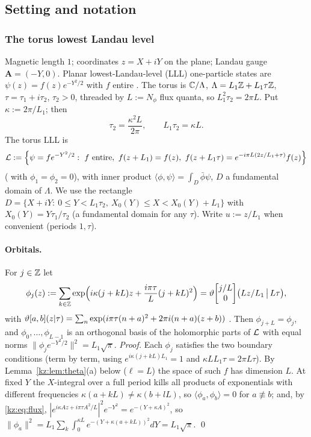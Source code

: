 \subsection{Setting and notation}\label{kz:sec:setting}

\subsubsection{The torus lowest Landau level}\label{kz:sec:lll}

Magnetic length $1$; coordinates $z=X+iY$ on the plane; Landau gauge $\mathbf A=(-Y,0)$. Planar
lowest-Landau-level (LLL) one-particle states are $\psi(z)=f(z)e^{-Y^2/2}$ with $f$ entire
\cite[eq.~(44)]{RR96}. The torus is
$\mathbb{C}/\Lambda$, $\Lambda=L_1\mathbb{Z}+L_1\tau\mathbb{Z}$, $\tau=\tau_1+i\tau_2$, $\tau_2>0$, threaded by $L:=N_\phi$
flux quanta, so $L_1^2\tau_2=2\pi L$. Put $\kappa:=2\pi/L_1$; then
\begin{equation}\label{kz:eq:flux}
\tau_2=\frac{\kappa^2L}{2\pi},\qquad L_1\tau_2=\kappa L .
\end{equation}
The torus LLL is
\[
\kzL:=\Big\{\psi=fe^{-Y^2/2}:\ f\ \text{entire},\ f(z+L_1)=f(z),\
f(z+L_1\tau)=e^{-i\pi L(2z/L_1+\tau)}f(z)\Big\}
\]
(\cite[eq.~(45)]{RR96} with $\phi_1=\phi_2=0$), with inner product $\langle\phi,\psi\rangle=\int_D\bar\phi\psi$,
$D$ a fundamental domain of $\Lambda$. We use the rectangle $D=\{X+iY:\ 0\le Y<L_1\tau_2,\
X_0(Y)\le X<X_0(Y)+L_1\}$ with $X_0(Y)=Y\tau_1/\tau_2$ (a fundamental domain for any $\tau$).
Write $u:=z/L_1$ when convenient (periods $1,\tau$).

\paragraph{Orbitals.} For $j\in\mathbb{Z}$ let
\begin{equation}\label{kz:eq:orbital}
\phi_j(z):=\sum_{k\in\mathbb{Z}}\exp\!\Big(i\kappa(j+kL)z+\frac{i\pi\tau}{L}(j+kL)^2\Big)
=\vartheta\!\begin{bmatrix} j/L\\ 0\end{bmatrix}\!\big(Lz/L_1\,\big|\,L\tau\big),
\end{equation}
with $\vartheta[a,b](z|\tau)=\sum_n\exp(i\pi\tau(n+a)^2+2\pi i(n+a)(z+b))$ \cite[eq.~(65)]{RR96}. Then
$\phi_{j+L}=\phi_j$, and $\phi_0,\dots,\phi_{L-1}$ is an orthogonal basis of the holomorphic parts of
$\mathcal{L}$ with equal norms $\|\phi_je^{-Y^2/2}\|^2=L_1\sqrt\pi$.
\emph{Proof.} Each $\phi_j$ satisfies the two boundary conditions (term by term, using
$e^{i\kappa(j+kL)L_1}=1$ and $\kappa L L_1\tau=2\pi L\tau$). By Lemma~\ref{kz:lem:theta}(a) below
($\ell=L$) the space of such $f$ has dimension $L$. At fixed $Y$ the $X$-integral over a full period
kills all products of exponentials with different frequencies $\kappa(a+kL)\neq\kappa(b+lL)$, so
$\langle\phi_a,\phi_b\rangle=0$ for $a\not\equiv b$; and, by \eqref{kz:eq:flux},
$|e^{i\kappa Az+i\pi\tau A^2/L}|^2e^{-Y^2}=e^{-(Y+\kappa A)^2}$, so
$\|\phi_a\|^2=L_1\sum_k\int_0^{\kappa L}e^{-(Y+\kappa(a+kL))^2}dY=L_1\sqrt\pi$. \qed

